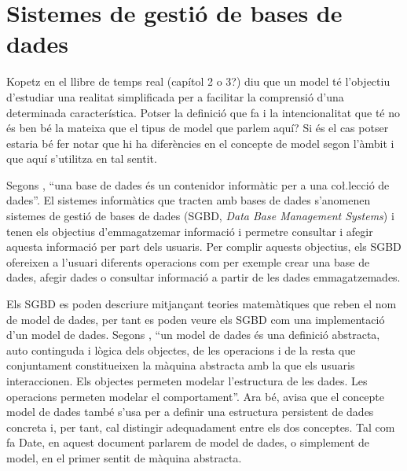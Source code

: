 \section{Sistemes de gestió de bases de dades}
\label{sec:art:sgbd}





Kopetz en el llibre de temps real (capítol 2 o 3?) diu que un model té l'objectiu d'estudiar una realitat simplificada per a facilitar la comprensió d'una determinada característica. Potser la definició que fa i la intencionalitat que té no és ben bé la mateixa que el tipus de model que parlem aquí? Si és el cas potser estaria bé fer notar que hi ha diferències en el concepte de model segon l'àmbit i que aquí s'utilitza en tal sentit.






Segons \textcite{date:introduction}, ``una base de dades és un
contenidor informàtic per a una co\l.lecció de dades''. El sistemes
informàtics que tracten amb bases de dades s'anomenen sistemes de
gestió de bases de dades (SGBD, \emph{Data Base Management Systems}) i
tenen els objectius d'emmagatzemar informació i permetre consultar i
afegir aquesta informació per part dels usuaris.  Per complir aquests
objectius, els SGBD ofereixen a l'usuari diferents operacions com per
exemple crear una base de dades, afegir dades o consultar informació a
partir de les dades emmagatzemades.

Els SGBD es poden descriure mitjançant teories matemàtiques que reben
el nom de model de dades, per tant es poden veure els SGBD com una
implementació d'un model de dades.  Segons
\citeauthor{date:introduction}, ``un model de dades és una definició
abstracta, auto continguda i lògica dels objectes, de les operacions i
de la resta que conjuntament constitueixen la màquina abstracta amb la
que els usuaris interaccionen. Els objectes permeten modelar
l'estructura de les dades. Les operacions permeten modelar el
comportament''. Ara bé, \citeauthor{date:introduction} avisa que el
concepte model de dades també s'usa per a definir una estructura
persistent de dades concreta i, per tant, cal distingir adequadament
entre els dos conceptes.  Tal com fa Date, en aquest document parlarem
de model de dades, o simplement de model, en el primer sentit de
màquina abstracta.



